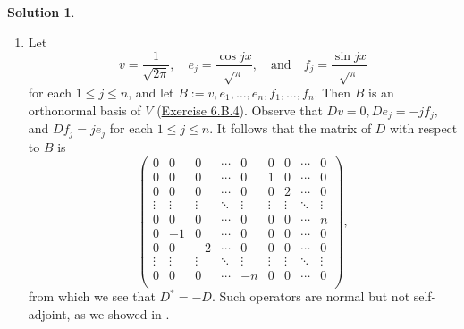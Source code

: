 \documentclass[12pt]{article}
\theoremstyle{definition}
\theoremstyle{exercise}
\theoremstyle{solution}
\newtheorem*{solution}{Solution}
\newcommand{\quand}{\quad \text{and} \quad}
\begin{document}
\begin{solution}
    \begin{enumerate}
        \item Let
        \[
            v = \frac{1}{\sqrt{2 \pi}}, \quad e_j = \frac{\cos jx}{\sqrt{\pi}}, \quand f_j = \frac{\sin jx}{\sqrt{\pi}}
        \]
        for each \( 1 \leq j \leq n \), and let \( B := v, e_1, \ldots, e_n, f_1, \ldots, f_n \). Then \( B \) is an orthonormal basis of \( V \) (\href{https://lew98.github.io/Mathematics/LADR_Section_6_B_Exercises.pdf}{Exercise 6.B.4}). Observe that \( Dv = 0, De_j = -j f_j, \) and \( Df_j = j e_j \) for each \( 1 \leq j \leq n \). It follows that the matrix of \( D \) with respect to \( B \) is
        \[
            \begin{pmatrix}
                0 & 0 & 0 & \cdots & 0 & 0 & 0 & \cdots & 0 \\
                0 & 0 & 0 & \cdots & 0 & 1 & 0 & \cdots & 0 \\
                0 & 0 & 0 & \cdots & 0 & 0 & 2 & \cdots & 0 \\
                \vdots & \vdots & \vdots & \ddots & \vdots & \vdots & \vdots & \ddots & \vdots \\
                0 & 0 & 0 & \cdots & 0 & 0 & 0 & \cdots & n \\
                0 & -1 & 0 & \cdots & 0 & 0 & 0 & \cdots & 0 \\
                0 & 0 & -2 & \cdots & 0 & 0 & 0 & \cdots & 0 \\
                \vdots & \vdots & \vdots & \ddots & \vdots & \vdots & \vdots & \ddots & \vdots \\
                0 & 0 & 0 & \cdots & -n & 0 & 0 & \cdots & 0 \\
            \end{pmatrix},
        \]
        from which we see that \( D^* = -D \). Such operators are normal but not self-adjoint, as we showed in .


\end{enumerate}
\end{solution}
\end{document}

